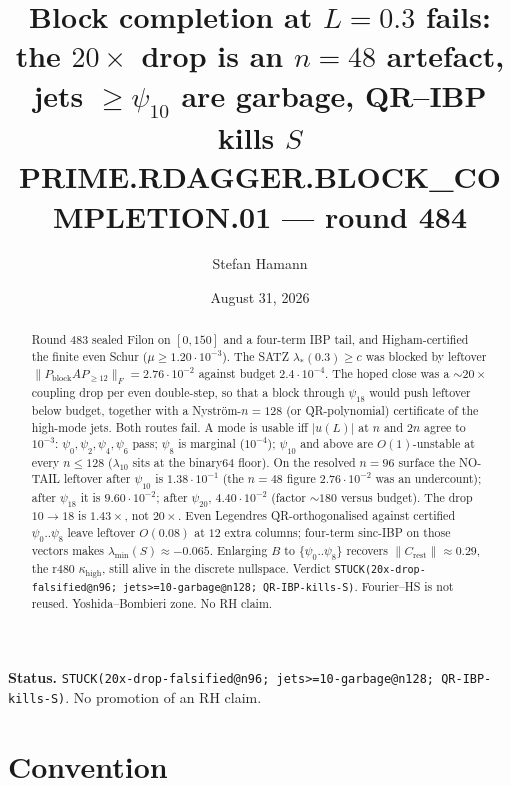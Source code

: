 \documentclass[11pt]{article}
\title{\bfseries Block completion at $L=0.3$ fails:\\[2mm]
the $20\times$ drop is an $n=48$ artefact,\\[1mm]
jets $\ge\psi_{10}$ are garbage, QR--IBP kills $S$\\[2mm]
\large PRIME.RDAGGER.BLOCK\_COMPLETION.01 --- round 484}
\author{Stefan Hamann}
\date{August 31, 2026}
\theoremstyle{remark}
\begin{document}
\maketitle

\begin{abstract}\noindent
Round 483 sealed Filon on $[0,150]$ and a four-term
IBP tail, and Higham-certified the finite even Schur
($\mu\ge1.20\cdot10^{-3}$).
The SATZ $\lambda_*(0.3)\ge c$ was blocked by leftover
$\|P_{\mathrm{block}}A P_{\ge12}\|_F=2.76\cdot10^{-2}$
against budget $2.4\cdot10^{-4}$.
The hoped close was a $\sim20\times$ coupling drop per
even double-step, so that a block through $\psi_{18}$
would push leftover below budget, together with a
Nystr\"om-$n=128$ (or QR-polynomial) certificate of the
high-mode jets.
Both routes fail.
A mode is usable iff $|u(L)|$ at $n$ and $2n$ agree to
$10^{-3}$: $\psi_0,\psi_2,\psi_4,\psi_6$ pass;
$\psi_8$ is marginal ($10^{-4}$);
$\psi_{10}$ and above are $O(1)$-unstable at every
$n\le128$ ($\lambda_{10}$ sits at the binary64 floor).
On the resolved $n=96$ surface the NO-TAIL leftover
after $\psi_{10}$ is $1.38\cdot10^{-1}$ (the $n=48$
figure $2.76\cdot10^{-2}$ was an undercount);
after $\psi_{18}$ it is $9.60\cdot10^{-2}$;
after $\psi_{20}$, $4.40\cdot10^{-2}$
(factor $\sim180$ versus budget).
The drop $10\to18$ is $1.43\times$, not $20\times$.
Even Legendres QR-orthogonalised against certified
$\psi_0..\psi_8$ leave leftover $O(0.08)$ at $12$ extra
columns; four-term sinc-IBP on those vectors makes
$\lambda_{\min}(S)\approx-0.065$.
Enlarging $B$ to $\{\psi_0..\psi_8\}$ recovers
$\|C_{\mathrm{rest}}\|\approx0.29$, the r480
$\kappa_{\mathrm{high}}$, still alive in the discrete
nullspace.
Verdict
\texttt{STUCK(20x-drop-falsified@n96; jets>=10-garbage@n128; QR-IBP-kills-S)}.
Fourier--HS is not reused.
Yoshida--Bombieri zone.  No RH claim.
\end{abstract}

\medskip\noindent
\textbf{Status.}\enspace
\texttt{STUCK(20x-drop-falsified@n96; jets>=10-garbage@n128; QR-IBP-kills-S)}.
No promotion of an RH claim.

\begin{center}
\end{center}

\section{Convention}
\end{document}
